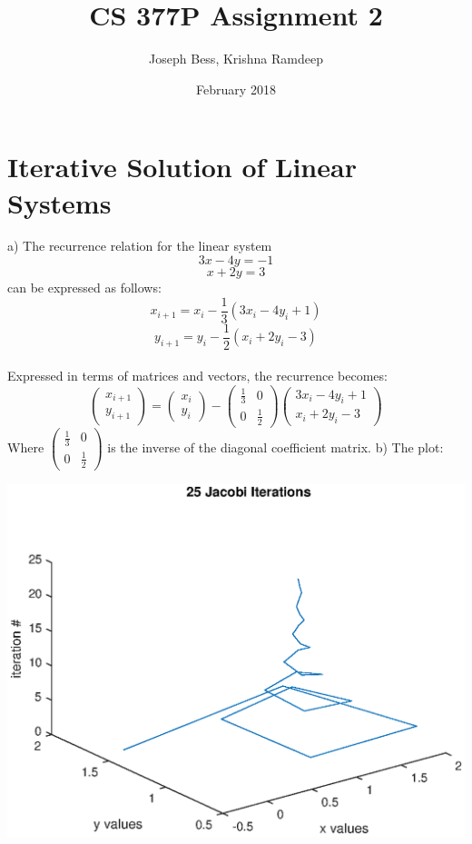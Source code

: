 \documentclass{article}
\title{CS 377P Assignment 2}
\author{Joseph Bess, Krishna Ramdeep}
\date{February 2018}
\begin{document}
\maketitle

\section{Iterative Solution of Linear Systems}
\par
a) The recurrence relation for the linear system \[3x-4y=-1\] \[x+2y=3\] can be expressed as follows: \[x_{i+1} = x_i-\frac{1}{3}(3x_i-4y_i+1)\] \[y_{i+1} = y_i-\frac{1}{2}(x_i+2y_i-3)\]\\
Expressed in terms of matrices and vectors, the recurrence becomes:\\ \[\begin{pmatrix}x_{i+1}\\y_{i+1}\end{pmatrix}=\begin{pmatrix}x_i\\y_i\end{pmatrix}-\begin{pmatrix}\frac{1}{3} & 0\\0 & \frac{1}{2}\end{pmatrix}\begin{pmatrix}3x_i-4y_i+1\\x_i+2y_i-3\end{pmatrix}\]
Where $\begin{pmatrix}\frac{1}{3} & 0\\0 & \frac{1}{2}\end{pmatrix}$ is the inverse of the diagonal coefficient matrix.
\newpage
b) The plot:
\begin{center}
    \includegraphics[scale = 0.8]{jacobi25.eps}
\end{center}
\end{document}
